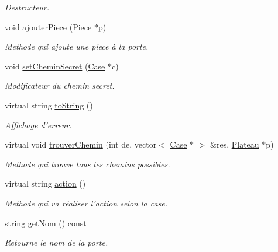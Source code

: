 \begin{DoxyCompactItemize}
\begin{DoxyCompactList}\small\item\em \-Destructeur. \end{DoxyCompactList}\item 
void \hyperlink{classPorte_adc13e346f7349fd3dc901ff2197f9106}{ajouter\-Piece} (\hyperlink{classPiece}{\-Piece} $\ast$p)
\begin{DoxyCompactList}\small\item\em \-Methode qui ajoute une piece à la porte. \end{DoxyCompactList}\item 
void \hyperlink{classPorte_ad7f509198fda1bc591bb654b3a3b1fa2}{set\-Chemin\-Secret} (\hyperlink{classCase}{\-Case} $\ast$c)
\begin{DoxyCompactList}\small\item\em \-Modificateur du chemin secret. \end{DoxyCompactList}\item 
\hypertarget{classPorte_ace3891879a69f2d29ade65d71d869377}{virtual string \hyperlink{classPorte_ace3891879a69f2d29ade65d71d869377}{to\-String} ()}\label{classPorte_ace3891879a69f2d29ade65d71d869377}

\begin{DoxyCompactList}\small\item\em \-Affichage d'erreur. \end{DoxyCompactList}\item 
virtual void \hyperlink{classPorte_a2029ca8cf88e282a6c0a55c49317b738}{trouver\-Chemin} (int de, vector$<$ \hyperlink{classCase}{\-Case} $\ast$ $>$ \&res, \hyperlink{classPlateau}{\-Plateau} $\ast$p)
\begin{DoxyCompactList}\small\item\em \-Methode qui trouve tous les chemins possibles. \end{DoxyCompactList}\item 
virtual string \hyperlink{classPorte_a71f6ed526931178c012e8653e609e0e7}{action} ()
\begin{DoxyCompactList}\small\item\em \-Methode qui va réaliser l'action selon la case. \end{DoxyCompactList}\item 
string \hyperlink{classPorte_abeca2ec41fa7476859b90a944736a20a}{get\-Nom} () const 
\begin{DoxyCompactList}\small\item\em \-Retourne le nom de la porte. \end{DoxyCompactList}\end{DoxyCompactItemize}


